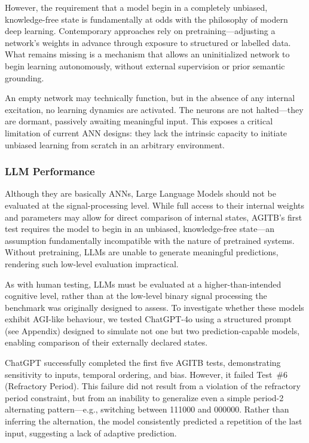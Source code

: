 \documentclass{article}
\begin{document}
However, the requirement that a model begin in a completely unbiased, knowledge-free state is fundamentally at odds with the philosophy of modern deep learning. Contemporary approaches rely on pretraining—adjusting a network’s weights in advance through exposure to structured or labelled data. What remains missing is a mechanism that allows an uninitialized network to begin learning autonomously, without external supervision or prior semantic grounding.

An empty network may technically function, but in the absence of any internal excitation, no learning dynamics are activated. The neurons are not halted—they are dormant, passively awaiting meaningful input. This exposes a critical limitation of current ANN designs: they lack the intrinsic capacity to initiate unbiased learning from scratch in an arbitrary environment.
 
\subsubsection{LLM Performance}

Although they are basically ANNs, Large Language Models should not be evaluated at the signal-processing level. While full access to their internal weights and parameters may allow for direct comparison of internal states, AGITB’s first test requires the model to begin in an unbiased, knowledge-free state—an assumption fundamentally incompatible with the nature of pretrained systems. Without pretraining, LLMs are unable to generate meaningful predictions, rendering such low-level evaluation impractical.

As with human testing, LLMs must be evaluated at a higher-than-intended cognitive level, rather than at the low-level binary signal processing the benchmark was originally designed to assess. To investigate whether these models exhibit AGI-like behaviour, we tested ChatGPT-4o using a structured prompt (see Appendix) designed to simulate not one but two prediction-capable models, enabling comparison of their externally declared states.

ChatGPT successfully completed the first five AGITB tests, demonstrating sensitivity to inputs, temporal ordering, and bias. However, it failed Test~\#6 (Refractory Period). This failure did not result from a violation of the refractory period constraint, but from an inability to generalize even a simple period-2 alternating pattern—e.g., switching between 111000 and 000000. Rather than inferring the alternation, the model consistently predicted a repetition of the last input, suggesting a lack of adaptive prediction.
\end{document}
